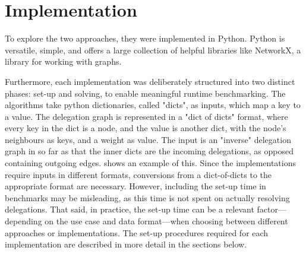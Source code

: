 \graphicspath{{./figures/}}

\chapter{Implementation}

To explore the two approaches, they were implemented in Python. Python is versatile, simple, and offers a large collection of helpful libraries like NetworkX, a library for working with graphs. 

Furthermore, each implementation was deliberately structured into two distinct phases: set-up and solving, to enable meaningful runtime benchmarking. The algorithms take python dictionaries, called "dicts", as inputs, which map a key to a value.  The delegation graph is represented in a "dict of dicts" format, where every key in the dict is a node, and the value is another dict, with the node's neighbours as keys, and a weight as value. The input is an "inverse" delegation graph in so far as that the inner dicts are the incoming delegations, as opposed containing outgoing edges.  shows an example of this. Since the implementations require inputs in different formats, conversions from a dict-of-dicts to the appropriate format are necessary. However, including the set-up time in benchmarks may be misleading, as this time is not spent on actually resolving delegations. That said, in practice, the set-up time can be a relevant factor—depending on the use case and data format—when choosing between different approaches or implementations. The set-up procedures required for each implementation are described in more detail in the sections below.

